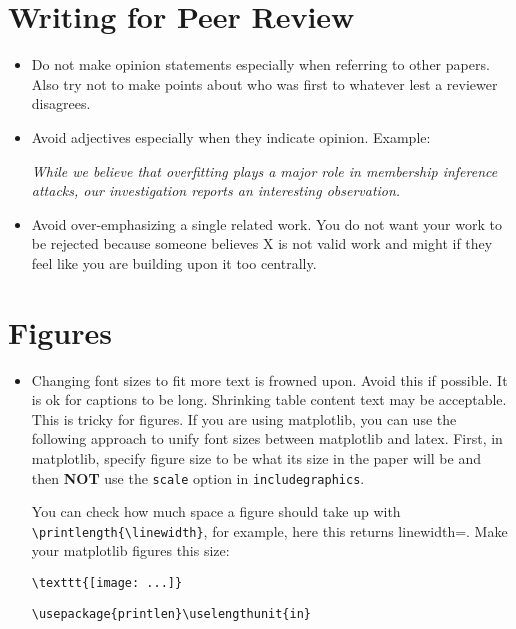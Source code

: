 \section{Writing for Peer Review}

\begin{itemize}
\item{} Do not make opinion statements especially when referring to other papers. Also try not to
  make points about who was first to whatever lest a reviewer disagrees.

\item{} Avoid adjectives especially when they indicate opinion. Example:

  \textit{While we believe that overfitting plays a major role in membership inference attacks, our
    investigation reports an interesting observation.}

\item{} Avoid over-emphasizing a single related work. You do not want your work to be rejected
  because someone believes X is not valid work and might if they feel like you are building
  upon it too centrally.
\end{itemize}

\section{Figures}

\begin{itemize}
  \item{} Changing font sizes to fit more text is frowned upon. Avoid this if possible. It is ok
    for captions to be long. Shrinking table content text may be acceptable. This is tricky for
    figures. If you are using matplotlib, you can use the following approach to unify font sizes
    between matplotlib and latex. First, in matplotlib, specify figure size to be what its size in
    the paper will be and then \textbf{NOT} use the \verb|scale| option in \verb|includegraphics|.

    You can check how much space a figure should take up with \verb|\printlength{\linewidth}|, for
    example, here this returns linewidth=\printlength{\linewidth}. Make your matplotlib figures
    this size:
\begin{verbatim}
\texttt{[image: ...]}
\end{verbatim}

\begin{verbatim}
\usepackage{printlen}\uselengthunit{in}
\end{verbatim}

\end{itemize}

